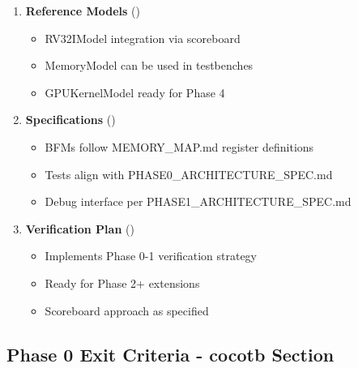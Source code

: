 \begin{record}

\begin{enumerate}
\def\labelenumi{\arabic{enumi}.}
\item
  \textbf{Reference Models} ()

  \begin{itemize}
  \tightlist
  \item
    \ok{} RV32IModel integration via scoreboard
  \item
    \ok{} MemoryModel can be used in testbenches
  \item
    \ok{} GPUKernelModel ready for Phase 4
  \end{itemize}
\item
  \textbf{Specifications} ()

  \begin{itemize}
  \tightlist
  \item
    \ok{} BFMs follow MEMORY\_\allowbreak{}MAP.md register definitions
  \item
    \ok{} Tests align with
    PHASE0\_\allowbreak{}ARCHITECTURE\_\allowbreak{}SPEC.md
  \item
    \ok{} Debug interface per
    PHASE1\_\allowbreak{}ARCHITECTURE\_\allowbreak{}SPEC.md
  \end{itemize}
\item
  \textbf{Verification Plan} ()

  \begin{itemize}
  \tightlist
  \item
    \ok{} Implements Phase 0-1 verification strategy
  \item
    \ok{} Ready for Phase 2+ extensions
  \item
    \ok{} Scoreboard approach as specified
  \end{itemize}
\end{enumerate}

\end{record}

\subsection{Phase 0 Exit Criteria - cocotb Section}\label{cr:app:archive-cocotb-setup-summary:phase-0-exit-criteria-cocotb-section}

